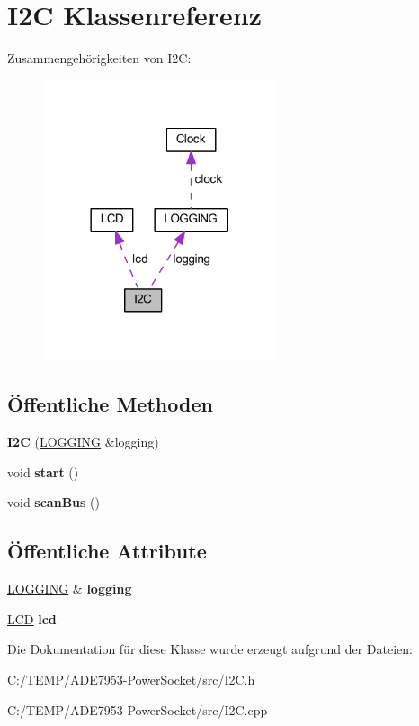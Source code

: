 \hypertarget{class_i2_c}{}\section{I2C Klassenreferenz}
\label{class_i2_c}


Zusammengehörigkeiten von I2C\+:
\nopagebreak
\begin{figure}[H]
\begin{center}
\leavevmode
\includegraphics[width=194pt]{class_i2_c__coll__graph}
\end{center}
\end{figure}
\subsection*{Öffentliche Methoden}
\begin{DoxyCompactItemize}
\item 
\mbox{\label{class_i2_c_a54577068652b30b6031442a28fa9a25b}} 
{\bfseries I2C} (\hyperlink{class_l_o_g_g_i_n_g}{L\+O\+G\+G\+I\+NG} \&logging)
\item 
\mbox{\label{class_i2_c_a07463a2babdabbd675a2745fb53650ca}} 
void {\bfseries start} ()
\item 
\mbox{\label{class_i2_c_aa38babf0746e63bc9414ec0665f15b32}} 
void {\bfseries scan\+Bus} ()
\end{DoxyCompactItemize}
\subsection*{Öffentliche Attribute}
\begin{DoxyCompactItemize}
\item 
\mbox{\label{class_i2_c_a8a905521f58afc3afb0ec9fd80f38c27}} 
\hyperlink{class_l_o_g_g_i_n_g}{L\+O\+G\+G\+I\+NG} \& {\bfseries logging}
\item 
\mbox{\label{class_i2_c_afc1d2f3b9b877ce0db0e02a7ea85d42b}} 
\hyperlink{class_l_c_d}{L\+CD} {\bfseries lcd}
\end{DoxyCompactItemize}


Die Dokumentation für diese Klasse wurde erzeugt aufgrund der Dateien\+:\begin{DoxyCompactItemize}
\item 
C\+:/\+T\+E\+M\+P/\+A\+D\+E7953-\/\+Power\+Socket/src/I2\+C.\+h\item 
C\+:/\+T\+E\+M\+P/\+A\+D\+E7953-\/\+Power\+Socket/src/I2\+C.\+cpp\end{DoxyCompactItemize}
